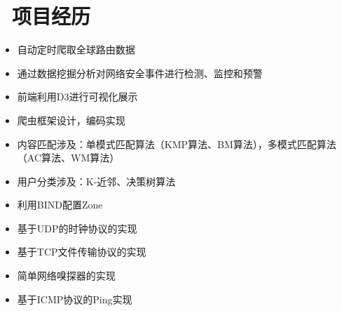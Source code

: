 \documentclass{resume}
\begin{document}

\section{\faBriefcase\ 项目经历}
\begin{onehalfspacing}
\begin{itemize}
  \item 自动定时爬取全球路由数据
  \item 通过数据挖掘分析对网络安全事件进行检测、监控和预警
  \item 前端利用D3进行可视化展示
\end{itemize}
\end{onehalfspacing}

\begin{onehalfspacing}
\begin{itemize}
  \item 爬虫框架设计，编码实现
  \item 内容匹配涉及：单模式匹配算法（KMP算法、BM算法），多模式匹配算法（AC算法、WM算法）
  \item 用户分类涉及：K-近邻、决策树算法
\end{itemize}
\end{onehalfspacing}

\begin{onehalfspacing}
\begin{itemize}
  \item 利用BIND配置Zone
  \item 基于UDP的时钟协议的实现
  \item 基于TCP文件传输协议的实现
  \item 简单网络嗅探器的实现
  \item 基于ICMP协议的Ping实现
\end{itemize}
\end{onehalfspacing}
\end{document}
